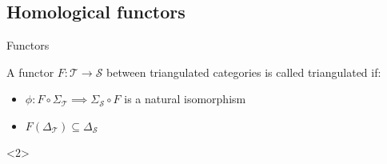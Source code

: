 \documentclass{beamer}
\begin{document}
        \subsection{Homological functors}
            \begin{frame}{Functors}
                \begin{definition}
                    A functor $F:\mathcal{T}\rightarrow\mathcal{S}$ between triangulated categories is called triangulated if:
                    \begin{itemize}
                        \item $\phi: F\circ\Sigma_{\mathcal{T}}\implies \Sigma_{\mathcal{S}}\circ F$ is a natural isomorphism
                        \item $F(\Delta_{\mathcal{T}})\subseteq\Delta_{\mathcal{S}}$
                    \end{itemize}
                \end{definition}
                \begin{onlyenv}<2>
                    

\end{onlyenv}
\end{frame}
\end{document}
